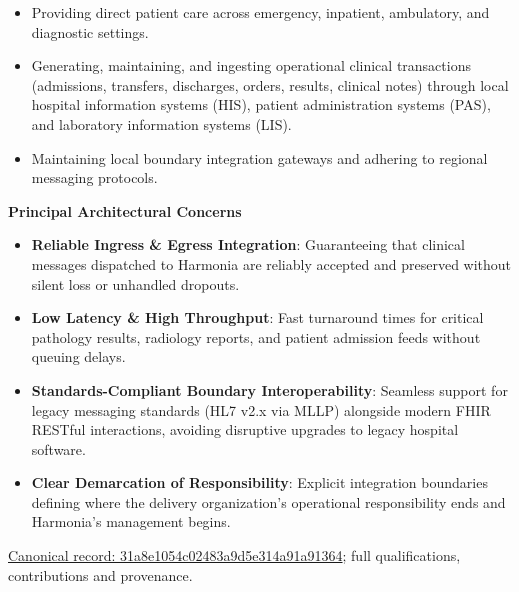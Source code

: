 \begin{itemize}


\item Providing direct patient care across emergency, inpatient, ambulatory, and diagnostic settings.

\item Generating, maintaining, and ingesting operational clinical transactions (admissions, transfers, discharges, orders, results, clinical notes) through local hospital information systems (HIS), patient administration systems (PAS), and laboratory information systems (LIS).

\item Maintaining local boundary integration gateways and adhering to regional messaging protocols.

\end{itemize}


\par\medskip\textbf{Principal Architectural Concerns}\par


\begin{itemize}


\item \textbf{Reliable Ingress \& Egress Integration}: Guaranteeing that clinical messages dispatched to Harmonia are reliably accepted and preserved without silent loss or unhandled dropouts.

\item \textbf{Low Latency \& High Throughput}: Fast turnaround times for critical pathology results, radiology reports, and patient admission feeds without queuing delays.

\item \textbf{Standards-Compliant Boundary Interoperability}: Seamless support for legacy messaging standards (HL7 v2.x via MLLP) alongside modern FHIR RESTful interactions, avoiding disruptive upgrades to legacy hospital software.

\item \textbf{Clear Demarcation of Responsibility}: Explicit integration boundaries defining where the delivery organization's operational responsibility ends and Harmonia's management begins.

\end{itemize}

{\footnotesize \href{../../../../continuum/motivation/stakeholder/31a8e1054c02483a9d5e314a91a91364.md}{Canonical record: 31a8e1054c02483a9d5e314a91a91364}; full qualifications, contributions and provenance.}\par
